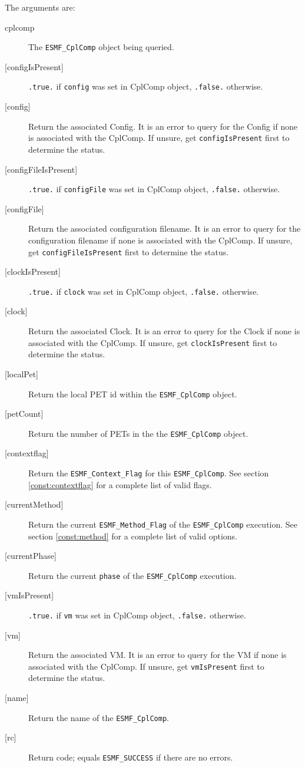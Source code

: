    The arguments are:
   \begin{description}
   \item[cplcomp]
     The {\tt ESMF\_CplComp} object being queried.
   \item[{[configIsPresent]}]
     {\tt .true.} if {\tt config} was set in CplComp object,
     {\tt .false.} otherwise.
   \item[{[config]}]
     Return the associated Config.
     It is an error to query for the Config if none is associated with
     the CplComp. If unsure, get {\tt configIsPresent} first to determine
     the status.
   \item[{[configFileIsPresent]}]
     {\tt .true.} if {\tt configFile} was set in CplComp object,
     {\tt .false.} otherwise.
   \item[{[configFile]}]
     Return the associated configuration filename.
     It is an error to query for the configuration filename if none is associated with
     the CplComp. If unsure, get {\tt configFileIsPresent} first to determine
     the status.
   \item[{[clockIsPresent]}]
     {\tt .true.} if {\tt clock} was set in CplComp object,
     {\tt .false.} otherwise.
   \item[{[clock]}]
     Return the associated Clock.
     It is an error to query for the Clock if none is associated with
     the CplComp. If unsure, get {\tt clockIsPresent} first to determine
     the status.
   \item[{[localPet]}]
     Return the local PET id within the {\tt ESMF\_CplComp} object.
   \item[{[petCount]}]
     Return the number of PETs in the the {\tt ESMF\_CplComp} object.
   \item[{[contextflag]}]
     Return the {\tt ESMF\_Context\_Flag} for this {\tt ESMF\_CplComp}.
     See section \ref{const:contextflag} for a complete list of valid flags.
   \item[{[currentMethod]}]
     Return the current {\tt ESMF\_Method\_Flag} of the {\tt ESMF\_CplComp} execution.
     See section \ref{const:method}  for a complete list of valid options.
   \item[{[currentPhase]}]
     Return the current {\tt phase} of the {\tt ESMF\_CplComp} execution.
   \item[{[vmIsPresent]}]
     {\tt .true.} if {\tt vm} was set in CplComp object,
     {\tt .false.} otherwise.
   \item[{[vm]}]
     Return the associated VM.
     It is an error to query for the VM if none is associated with
     the CplComp. If unsure, get {\tt vmIsPresent} first to determine
     the status.
   \item[{[name]}]
     Return the name of the {\tt ESMF\_CplComp}.
   \item[{[rc]}]
     Return code; equals {\tt ESMF\_SUCCESS} if there are no errors.
   \end{description}
   
